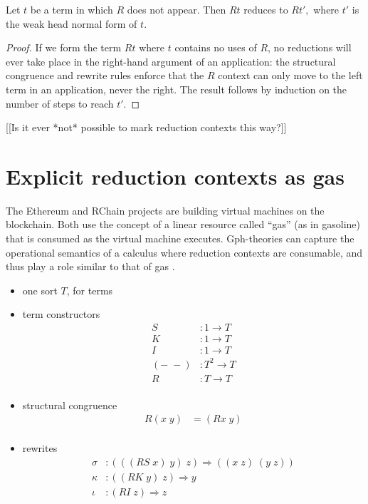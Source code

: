 \documentclass[a4paper,UKenglish]{lipics-v2016}
\begin{document}
\begin{theorem}
  Let $t$ be a term in which $R$ does not appear.  Then $Rt$ reduces to $Rt',$ where $t'$ is the weak head normal form of $t.$
\end{theorem}

\begin{proof}
If we form the term $Rt$ where $t$ contains no uses of $R$, no reductions will ever take place in the right-hand argument of an application: the structural congruence and rewrite rules enforce that the $R$ context can only move to the left term in an application, never the right.  The result follows by induction on the number of steps to reach $t'.$
\end{proof}

[[Is it ever *not* possible to mark reduction contexts this way?]]

\section{Explicit reduction contexts as gas}
The Ethereum \cite{Ethereum} and RChain \cite{RChain} projects are building virtual machines on the blockchain.  Both use the concept of a linear resource called ``gas'' (as in gasoline) that is consumed as the virtual machine executes.  Gph-theories can capture the operational semantics of a calculus where reduction contexts are consumable, and thus play a role similar to that of gas \cite{MeredithStayHDRA}.

\begin{itemize}
  \item one sort $T$, for terms
  \item term constructors
  \[\begin{array}{rl}
    S&:1 \to T\\
    K&:1 \to T\\
    I&:1 \to T\\
    (-\; -)&: T^2 \to T\\
    R&:T \to T\\
  \end{array}\]
  \item structural congruence
  \[\begin{array}{rl}
    R(x\; y) &= (Rx\; y)\\
  \end{array}\]
  \item rewrites
  \[\begin{array}{rl}
    \sigma&:(((RS\; x)\; y)\; z) \Rightarrow ((x\; z)\; (y\; z))\\
    \kappa&:((RK\; y)\; z) \Rightarrow y\\
    \iota&:(RI\; z) \Rightarrow z\\
  \end{array}\]
\end{itemize}
\end{document}

